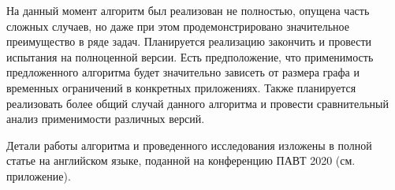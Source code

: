 \documentclass[12pt,a4paper]{scrartcl}
\begin{document}
На данный момент алгоритм был реализован не полностью, опущена часть сложных случаев, но даже при этом продемонстрировано значительное преимущество в ряде задач. Планируется реализацию закончить и провести испытания
на полноценной версии. Есть предположение, что применимость предложенного алгоритма будет значительно зависеть от размера графа и временных ограничений
в конкретных приложениях. Также планируется реализовать более общий случай данного алгоритма и провести сравнительный анализ применимости
различных версий.

Детали работы алгоритма и проведенного исследования изложены в полной статье на английском языке, поданной на конференцию ПАВТ 2020 (см. приложение).
\end{document}
